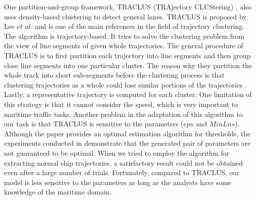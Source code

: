 \documentclass[12pt,glossary]{dalcsthesis}
\begin{document}
One partition-and-group framework, TRACLUS (TRAjectory CLUStering) \cite{Lee07}, also uses density-based clustering to detect general lanes. TRACLUS is proposed by Lee $et$ $al$. \cite{Lee07} and is one of the main references in the field of trajectory clustering.  The algorithm is trajectory-based. It tries to solve the clustering problem from the view of line segments of given whole trajectories. The general procedure of TRACLUS is to first partition each trajectory into line segments and then group close line segments into one particular cluster.  The reason why they partition the whole track into short sub-segments before the clustering process is that clustering trajectories as a whole could lose similar portions of the trajectories \cite{Lee07}. Lastly, a representative trajectory is computed for each cluster. One limitation of this strategy is that it cannot consider the speed, which is very important to maritime traffic tasks. Another problem in the adaptation of this algorithm to our task is that TRACLUS is sensitive to the parameters ($eps$ and $MinLns$). Although the paper provides an optimal estimation algorithm for thresholds, the experiments conducted in \cite{Lee07} demonstrate that the generated pair of parameters are not guaranteed to be optimal. When we tried to employ the algorithm for extracting normal ship trajectories, a satisfactory result could not be obtained even after a large number of trials. Fortunately, compared to TRACLUS, our model is less sensitive to the parameters as long as the analysts have some knowledge of the maritime domain.
\end{document}
